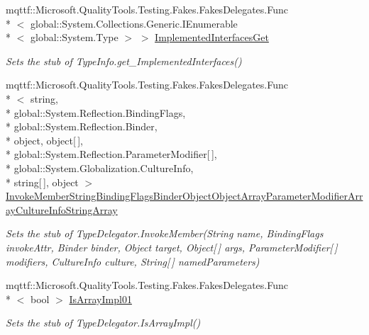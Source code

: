 \begin{DoxyCompactItemize}
mqttf\-::\-Microsoft.\-Quality\-Tools.\-Testing.\-Fakes.\-Fakes\-Delegates.\-Func\\*
$<$ global\-::\-System.\-Collections.\-Generic.\-I\-Enumerable\\*
$<$ global\-::\-System.\-Type $>$ $>$ \hyperlink{class_system_1_1_reflection_1_1_fakes_1_1_stub_type_delegator_a94f62f9cc545dd8c9646ab1ec481b194}{Implemented\-Interfaces\-Get}
\begin{DoxyCompactList}\small\item\em Sets the stub of Type\-Info.\-get\-\_\-\-Implemented\-Interfaces()\end{DoxyCompactList}\item 
mqttf\-::\-Microsoft.\-Quality\-Tools.\-Testing.\-Fakes.\-Fakes\-Delegates.\-Func\\*
$<$ string, \\*
global\-::\-System.\-Reflection.\-Binding\-Flags, \\*
global\-::\-System.\-Reflection.\-Binder, \\*
object, object\mbox{[}$\,$\mbox{]}, \\*
global\-::\-System.\-Reflection.\-Parameter\-Modifier\mbox{[}$\,$\mbox{]}, \\*
global\-::\-System.\-Globalization.\-Culture\-Info, \\*
string\mbox{[}$\,$\mbox{]}, object $>$ \hyperlink{class_system_1_1_reflection_1_1_fakes_1_1_stub_type_delegator_a562cd126dee580474166a625d36366ba}{Invoke\-Member\-String\-Binding\-Flags\-Binder\-Object\-Object\-Array\-Parameter\-Modifier\-Array\-Culture\-Info\-String\-Array}
\begin{DoxyCompactList}\small\item\em Sets the stub of Type\-Delegator.\-Invoke\-Member(\-String name, Binding\-Flags invoke\-Attr, Binder binder, Object target, Object\mbox{[}$\,$\mbox{]} args, Parameter\-Modifier\mbox{[}$\,$\mbox{]} modifiers, Culture\-Info culture, String\mbox{[}$\,$\mbox{]} named\-Parameters)\end{DoxyCompactList}\item 
mqttf\-::\-Microsoft.\-Quality\-Tools.\-Testing.\-Fakes.\-Fakes\-Delegates.\-Func\\*
$<$ bool $>$ \hyperlink{class_system_1_1_reflection_1_1_fakes_1_1_stub_type_delegator_adfaaf9a12210f2bc365c0ebc16186e72}{Is\-Array\-Impl01}
\begin{DoxyCompactList}\small\item\em Sets the stub of Type\-Delegator.\-Is\-Array\-Impl()\end{DoxyCompactList}\item 

\end{DoxyCompactItemize}
